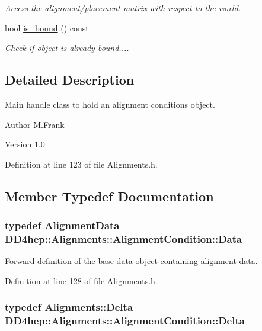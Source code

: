 \begin{DoxyCompactItemize}
\begin{DoxyCompactList}\small\item\em Access the alignment/placement matrix with respect to the world. \item\end{DoxyCompactList}\item 
bool \hyperlink{class_d_d4hep_1_1_alignments_1_1_alignment_condition_af3a63d0ab5e82de20ccf9550b81d4473}{is\_\-bound} () const 
\begin{DoxyCompactList}\small\item\em Check if object is already bound.... \item\end{DoxyCompactList}\end{DoxyCompactItemize}


\subsection{Detailed Description}
Main handle class to hold an alignment conditions object. \begin{DoxyAuthor}{Author}
M.Frank 
\end{DoxyAuthor}
\begin{DoxyVersion}{Version}
1.0 
\end{DoxyVersion}


Definition at line 123 of file Alignments.h.

\subsection{Member Typedef Documentation}
\hypertarget{class_d_d4hep_1_1_alignments_1_1_alignment_condition_a6fcd9bd0e9ac67afcf43270cbd9e9983}{
\subsubsection[{Data}]{\setlength{\rightskip}{0pt plus 5cm}typedef {\bf AlignmentData} {\bf DD4hep::Alignments::AlignmentCondition::Data}}}
\label{class_d_d4hep_1_1_alignments_1_1_alignment_condition_a6fcd9bd0e9ac67afcf43270cbd9e9983}


Forward definition of the base data object containing alignment data. 

Definition at line 128 of file Alignments.h.\hypertarget{class_d_d4hep_1_1_alignments_1_1_alignment_condition_a7a0f38a79212c07c444c8c8cd512bbd6}{
\subsubsection[{Delta}]{\setlength{\rightskip}{0pt plus 5cm}typedef {\bf Alignments::Delta} {\bf DD4hep::Alignments::AlignmentCondition::Delta}}}
\label{class_d_d4hep_1_1_alignments_1_1_alignment_condition_a7a0f38a79212c07c444c8c8cd512bbd6}


